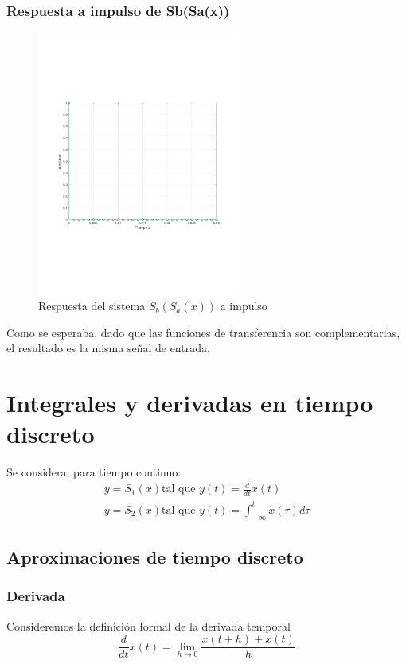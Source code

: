 		\subsubsection{Respuesta a impulso de Sb(Sa(x))}
 			\begin{figure}[H]
 				\center
 				\includegraphics[width=0.6\textwidth,clip, trim = {2cm 7.0cm 2.2cm 7.0cm}]{../imgs/2_SbSa.pdf}
				\caption{Respuesta del sistema $S_{b}(S_{a}(x))$ a impulso}
 				\label{fig:2_SbSa}
 			\end{figure}
 			
 			Como se esperaba, dado que las funciones de transferencia son complementarias, el resultado es la misma señal de entrada.
 			
\section{Integrales y derivadas en tiempo discreto}
	Se considera, para tiempo continuo:
	\begin{align}
		y = S_{1}(x) \text{tal que } y(t) = \frac{d}{dt}x(t) \\
		y = S_{2}(x) \text{tal que } y(t) = \int_{-\infty}^{t} x(\tau)d\tau
	\end{align}
	
	\subsection{Aproximaciones de tiempo discreto}
		\subsubsection{Derivada}
			Consideremos la definición formal de la derivada temporal
			\begin{equation}
				\frac{d}{dt}x(t) = \lim_{h \rightarrow 0} \frac{x(t + h) + x(t)}{h}
				\label{eq:derivative_def} 
			\end{equation}
			
